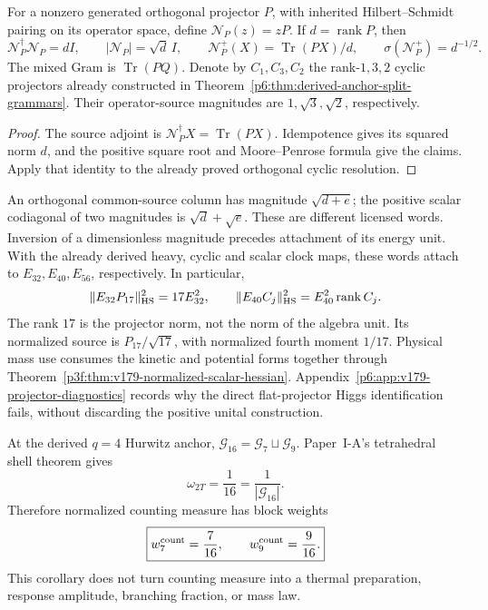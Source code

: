 \documentclass[12pt,a4paper]{article}
\begin{document}
\begin{theorem}
\label{p6:thm:v179-projector-response-grammar}
For a nonzero generated orthogonal projector \(P\), with inherited
Hilbert--Schmidt pairing on its operator space, define
\(\mathcal N_P(z)=zP\).  If \(d=\operatorname{rank}P\), then
\[
 \mathcal N_P^\dagger\mathcal N_P=dI,\qquad
 |\mathcal N_P|=\sqrt d\,I,\qquad
 \mathcal N_P^+(X)=\operatorname{Tr}(PX)/d,\qquad
 \sigma(\mathcal N_P^+)=d^{-1/2}.
\]
The mixed Gram is \(\operatorname{Tr}(PQ)\).
Denote by \(C_1,C_3,C_2\) the rank-\(1,3,2\) cyclic projectors already
constructed in Theorem~\ref{p6:thm:derived-anchor-split-grammars}.
Their operator-source magnitudes are \(1,\sqrt3,\sqrt2\), respectively.
\end{theorem}
\begin{proof}
The source adjoint is \(\mathcal N_P^\dagger X=\operatorname{Tr}(PX)\).
Idempotence gives its squared norm \(d\), and the positive square root and
Moore--Penrose formula give the claims.  Apply that identity to the
already proved orthogonal cyclic resolution.
\end{proof}

An orthogonal common-source column has magnitude \(\sqrt{d+e}\);
the positive scalar codiagonal of two magnitudes is \(\sqrt d+\sqrt e\).
These are different licensed words.  Inversion of a dimensionless
magnitude precedes attachment of its energy unit.  With the already
derived heavy, cyclic and scalar clock maps, these words attach to
\(E_{32},E_{40},E_{56}\), respectively.  In particular,
\[
 \|E_{32}P_{17}\|_{\rm HS}^2=17E_{32}^2,\qquad
 \|E_{40}C_j\|_{\rm HS}^2=E_{40}^2\operatorname{rank}C_j .
\]
The rank \(17\) is the projector norm, not the norm of the algebra unit.
Its normalized source is \(P_{17}/\sqrt{17}\), with normalized fourth
moment \(1/17\).  Physical mass use consumes the kinetic and potential
forms together through
Theorem~\ref{p3f:thm:v179-normalized-scalar-hessian}.
Appendix~\ref{p6:app:v179-projector-diagnostics} records why the direct
flat-projector Higgs identification fails, without discarding the
positive unital construction.



\begin{corollary}[Canonical counting measure on the \(16=7+9\) shell complement]
\label{p6:cor:G16-canonical-counting-measure}
At the derived \(q=4\) Hurwitz anchor,
\(\mathcal G_{16}=\mathcal G_7\sqcup\mathcal G_9\).  Paper~I-A's
tetrahedral shell theorem gives
\begin{equation}
\label{p6:eq:G16-counting-atom}
 \boxed{\omega_{2T}=\frac1{16}=\frac1{|\mathcal G_{16}|}.}
\end{equation}
Therefore normalized counting measure has block weights
\begin{equation}
\label{p6:eq:G16-counting-block-weights}
 \boxed{w_7^{\rm count}=\frac7{16},\qquad
 w_9^{\rm count}=\frac9{16}.}
\end{equation}
This corollary does not turn counting measure into a thermal preparation,
response amplitude, branching fraction, or mass law.
\end{corollary}
\end{document}
